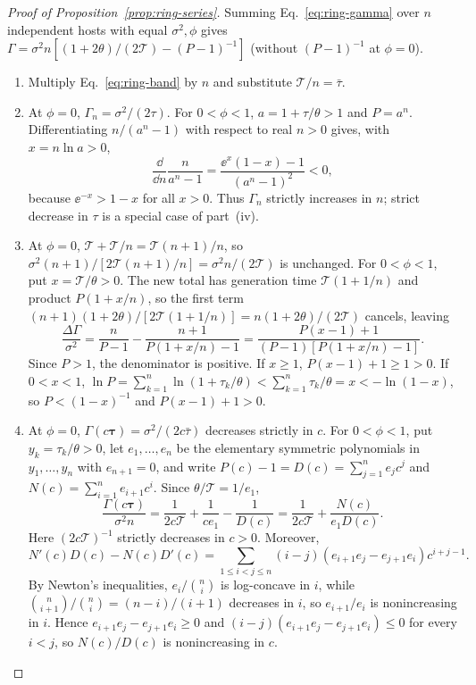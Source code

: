 \begin{proof}[Proof of Proposition~{\upshape\ref{prop:ring-series}}]
Summing Eq.~\eqref{eq:ring-gamma} over $n$ independent hosts with equal $\sigma^2, \phi$ gives $\Gamma = \sigma^2 n [(1 + 2\theta)/(2\mathcal{T}) - (P - 1)^{-1}]$ (without $(P - 1)^{-1}$ at $\phi = 0$).
\begin{enumerate}
\item[(i)] Multiply Eq.~\eqref{eq:ring-band} by $n$ and substitute $\mathcal{T}/n = \bar{\tau}$.
\item[(ii)] At $\phi = 0$, $\Gamma_n = \sigma^2/(2\tau)$. For $0 < \phi < 1$, $a = 1 + \tau/\theta > 1$ and $P = a^n$. Differentiating $n/(a^n - 1)$ with respect to real $n > 0$ gives, with $x = n\ln a > 0$,
\[
\frac{\dd}{\dd n}\frac{n}{a^n - 1} = \frac{\ee^x(1 - x) - 1}{(a^n - 1)^2} < 0,
\]
because $\ee^{-x} > 1 - x$ for all $x > 0$. Thus $\Gamma_n$ strictly increases in $n$; strict decrease in $\tau$ is a special case of part~(iv).
\item[(iii)] At $\phi = 0$, $\mathcal{T} + \mathcal{T}/n = \mathcal{T}(n + 1)/n$, so $\sigma^2(n + 1)/[2\mathcal{T}(n + 1)/n] = \sigma^2 n/(2\mathcal{T})$ is unchanged. For $0 < \phi < 1$, put $x = \mathcal{T}/\theta > 0$. The new total has generation time $\mathcal{T}(1 + 1/n)$ and product $P(1 + x/n)$, so the first term $(n + 1)(1 + 2\theta)/[2\mathcal{T}(1 + 1/n)] = n(1 + 2\theta)/(2\mathcal{T})$ cancels, leaving
\[
\frac{\Delta\Gamma}{\sigma^2} = \frac{n}{P - 1} - \frac{n + 1}{P(1 + x/n) - 1} = \frac{P(x - 1) + 1}{(P - 1)[P(1 + x/n) - 1]}.
\]
Since $P > 1$, the denominator is positive. If $x \ge 1$, $P(x - 1) + 1 \ge 1 > 0$. If $0 < x < 1$, $\ln P = \sum_{k=1}^n \ln(1 + \tau_k/\theta) < \sum_{k=1}^n \tau_k/\theta = x < -\ln(1 - x)$, so $P < (1 - x)^{-1}$ and $P(x - 1) + 1 > 0$.
\item[(iv)] At $\phi = 0$, $\Gamma(c\boldsymbol{\tau}) = \sigma^2/(2c\bar{\tau})$ decreases strictly in $c$. For $0 < \phi < 1$, put $y_k = \tau_k/\theta > 0$, let $e_1, \dots, e_n$ be the elementary symmetric polynomials in $y_1, \dots, y_n$ with $e_{n+1} = 0$, and write $P(c) - 1 = D(c) = \sum_{j=1}^n e_j c^j$ and $N(c) = \sum_{i=1}^n e_{i+1} c^i$. Since $\theta/\mathcal{T} = 1/e_1$,
\[
\frac{\Gamma(c\boldsymbol{\tau})}{\sigma^2 n} = \frac{1}{2c\mathcal{T}} + \frac{1}{c e_1} - \frac{1}{D(c)} = \frac{1}{2c\mathcal{T}} + \frac{N(c)}{e_1 D(c)}.
\]
Here $(2c\mathcal{T})^{-1}$ strictly decreases in $c > 0$. Moreover,
\[
N'(c)D(c) - N(c)D'(c) = \sum_{1 \le i < j \le n} (i - j)(e_{i+1}e_j - e_{j+1}e_i)c^{i+j-1}.
\]
By Newton's inequalities, $e_i / \binom{n}{i}$ is log-concave in $i$, while $\binom{n}{i+1}/\binom{n}{i} = (n - i)/(i + 1)$ decreases in $i$, so $e_{i+1}/e_i$ is nonincreasing in $i$. Hence $e_{i+1}e_j - e_{j+1}e_i \ge 0$ and $(i - j)(e_{i+1}e_j - e_{j+1}e_i) \le 0$ for every $i < j$, so $N(c)/D(c)$ is nonincreasing in $c$.

\end{enumerate}
\end{proof}
